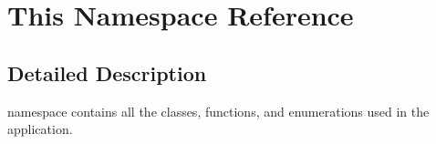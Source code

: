 \hypertarget{namespaceThis}{\section{This Namespace Reference}
\label{namespaceThis}
}


\subsection{Detailed Description}
namespace contains all the classes, functions, and enumerations used in the application. 